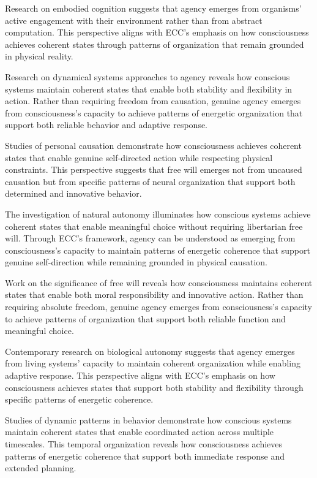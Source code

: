 Research on embodied cognition \cite{Noe2009} suggests that agency emerges from organisms' active engagement with their environment rather than from abstract computation. This perspective aligns with ECC's emphasis on how consciousness achieves coherent states through patterns of organization that remain grounded in physical reality.

Research on dynamical systems approaches to agency \cite{Thompson2007} reveals how conscious systems maintain coherent states that enable both stability and flexibility in action. Rather than requiring freedom from causation, genuine agency emerges from consciousness's capacity to achieve patterns of energetic organization that support both reliable behavior and adaptive response.

Studies of personal causation \cite{OConnor2000} demonstrate how consciousness achieves coherent states that enable genuine self-directed action while respecting physical constraints. This perspective suggests that free will emerges not from uncaused causation but from specific patterns of neural organization that support both determined and innovative behavior.

The investigation of natural autonomy \cite{Walter2001} illuminates how conscious systems achieve coherent states that enable meaningful choice without requiring libertarian free will. Through ECC's framework, agency can be understood as emerging from consciousness's capacity to maintain patterns of energetic coherence that support genuine self-direction while remaining grounded in physical causation.

Work on the significance of free will \cite{Kane1996} reveals how consciousness maintains coherent states that enable both moral responsibility and innovative action. Rather than requiring absolute freedom, genuine agency emerges from consciousness's capacity to achieve patterns of organization that support both reliable function and meaningful choice.

Contemporary research on biological autonomy \cite{Kauffman2000} suggests that agency emerges from living systems' capacity to maintain coherent organization while enabling adaptive response. This perspective aligns with ECC's emphasis on how consciousness achieves states that support both stability and flexibility through specific patterns of energetic coherence.

Studies of dynamic patterns in behavior \cite{Kelso1995} demonstrate how conscious systems maintain coherent states that enable coordinated action across multiple timescales. This temporal organization reveals how consciousness achieves patterns of energetic coherence that support both immediate response and extended planning.


